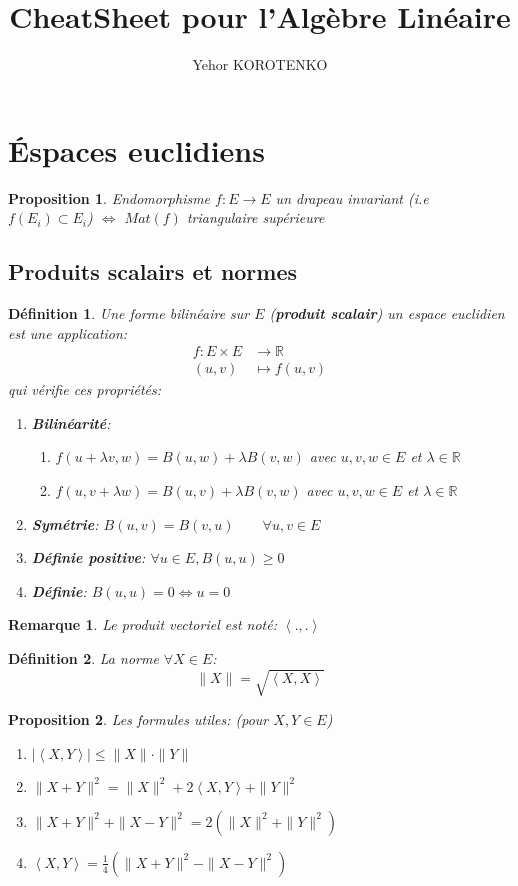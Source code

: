 \documentclass[a4paper]{article}
\author{Yehor KOROTENKO}
\title{CheatSheet pour l'Algèbre Linéaire}
\newcommand{\R}{\mathbb{R}}
\newcommand{\scalair}[1]{\left\langle #1 \right\rangle}
\newtheorem{definition}{Définition}[section]
\newtheorem{prop}{Proposition}[section]
\newtheorem*{remark}{Remarque}
\begin{document}
\maketitle
\section{Éspaces euclidiens}
   \begin{prop}
      Endomorphisme $f: E \to E$ un drapeau invariant (i.e $f(E_i) \subset E_i$) $\iff$ $Mat(f)$ triangulaire supérieure 
   \end{prop} 
\subsection{Produits scalairs et normes}
\begin{definition}
    Une forme bilinéaire sur $E$ (\textbf{produit scalair}) un espace euclidien est une application:
    \begin{align*}
        f: E \times E &\longrightarrow \R \\
        (u, v) &\longmapsto f(u, v) 
    \end{align*}
    qui vérifie ces propriétés:
    \begin{enumerate}
        \item \textbf{Bilinéarité}:
            \begin{enumerate}
                \item $f(u + \lambda v, w) = B(u, w) + \lambda B(v, w)$ avec $u, v, w \in E$ et  $\lambda \in \R$
                \item $f(u, v + \lambda w) = B(u, v) + \lambda B(v, w)$ avec $u, v, w \in E$ et $\lambda \in \R$
            \end{enumerate}
        \item \textbf{Symétrie}: $B(u, v) = B(v, u) \qquad \forall u, v \in E$ 
        \item \textbf{Définie positive}: $\forall u \in E, B(u, u) \ge 0$
        \item \textbf{Définie}: $B(u, u) = 0 \iff u = 0$
    \end{enumerate}
\end{definition}
\begin{remark}
    Le produit vectoriel est noté: $\scalair{., .}$ 
\end{remark}
\begin{definition}
    La norme $\forall X \in E$:
    \[
        \|X\| = \sqrt{\scalair{X, X}} 
    \] 
\end{definition}
\begin{prop}
   Les formules utiles: (pour $X, Y \in E$)
   \begin{enumerate}
       \item $|\scalair{X, Y}| \le \|X\| \cdot \|Y\|$
       \item $\|X + Y\|^2 = \|X\|^2 + 2\scalair{X, Y} + \|Y\|^2$ 
       \item $\|X + Y\|^2 + \|X - Y\|^2 = 2\left( \|X\|^2 + \|Y\|^2 \right) $
       \item $\scalair{X, Y} = \frac{1}{4}\left( \|X + Y\|^2 - \|X - Y\|^2 \right) $
   \end{enumerate}
\end{prop}
\end{document}
